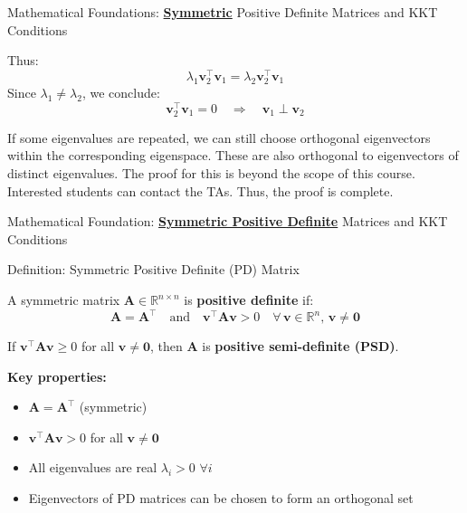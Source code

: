 \documentclass{beamer}
\begin{document}
\begin{frame}{Mathematical Foundations: \textbf{\underline{Symmetric}} Positive Definite Matrices and KKT Conditions}

Thus:
\[
\lambda_1 \bm{v}_2^{\top} \bm{v}_1 = \lambda_2 \bm{v}_2^{\top} \bm{v}_1
\]
Since $\lambda_1 \neq \lambda_2$, we conclude:
\[
\boxed{\bm{v}_2^{\top} \bm{v}_1 = 0 \quad \Rightarrow \quad \bm{v}_1 \perp \bm{v}_2}
\]

If some eigenvalues are repeated, we can still choose orthogonal eigenvectors within the corresponding eigenspace. These are also orthogonal to eigenvectors of distinct eigenvalues. The proof for this is beyond the scope of this course. Interested students can contact the TAs.
\vspace{0.3cm}
Thus, the proof is complete.

\end{frame}

\begin{frame}{Mathematical Foundation: \textbf{\underline{Symmetric Positive Definite}} Matrices and KKT Conditions}

\begin{block}{Definition: Symmetric Positive Definite (PD) Matrix}

A symmetric matrix $\bm{A} \in \mathbb{R}^{n \times n}$ is \textbf{positive definite} if:
\[
\bm{A} = \bm{A}^\top \quad \text{and} \quad \bm{v}^\top \bm{A} \bm{v} > 0 \quad \forall \, \bm{v} \in \mathbb{R}^n, \, \bm{v} \neq \bm{0}
\]

If $\bm{v}^\top \bm{A} \bm{v} \geq 0$ for all $\bm{v} \neq \bm{0}$, then $\bm{A}$ is \textbf{positive semi-definite (PSD)}.

\vspace{0.3cm}

\textbf{Key properties:}
\begin{itemize}
    \item $\bm{A} = \bm{A}^\top$ (symmetric)
    \item $\bm{v}^\top \bm{A} \bm{v} > 0$ for all $\bm{v} \neq \bm{0}$
    \item All eigenvalues are real $\lambda_i > 0$ $\forall i$
    \item Eigenvectors of PD matrices can be chosen to form an orthogonal set
\end{itemize}

\end{block}

\end{frame}
\end{document}
